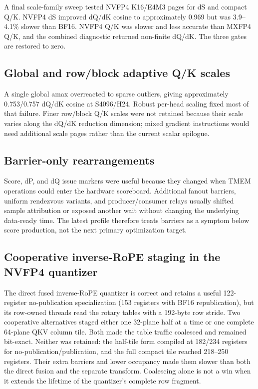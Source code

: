 A final scale-family sweep tested NVFP4 K16/E4M3 pages for dS and compact Q/K.
NVFP4 dS improved dQ/dK cosine to approximately 0.969 but was 3.9--4.1\%
slower than BF16.  NVFP4 Q/K was slower and less accurate than MXFP4 Q/K, and
the combined diagnostic returned non-finite dQ/dK.  The three gates are
restored to zero.

\subsection{Global and row/block adaptive Q/K scales}

A single global amax overreacted to sparse outliers, giving approximately
0.753/0.757 dQ/dK cosine at S4096/H24.  Robust per-head scaling fixed most of
that failure.  Finer row/block Q/K scales were not retained because their
scale varies along the dQ/dK reduction dimension; mixed gradient instructions
would need additional scale pages rather than the current scalar epilogue.

\subsection{Barrier-only rearrangements}

Score, dP, and dQ issue markers were useful because they changed when TMEM
operations could enter the hardware scoreboard.  Additional fanout barriers,
uniform rendezvous variants, and producer/consumer relays usually shifted
sample attribution or exposed another wait without changing the underlying
data-ready time.  The latest profile therefore treats barriers as a symptom
below score production, not the next primary optimization target.

\subsection{Cooperative inverse-RoPE staging in the NVFP4 quantizer}

The direct fused inverse-RoPE quantizer is correct and retains a useful
122-register no-publication specialization (153 registers with BF16
republication), but its row-owned threads read
the rotary tables with a 192-byte row stride.  Two cooperative alternatives
staged either one 32-plane half at a time or one complete 64-plane QKV column
tile.  Both made the table traffic coalesced and remained bit-exact.  Neither
was retained: the half-tile form compiled at 182/234 registers for
no-publication/publication, and the full compact tile reached 218--250
registers.  Their extra barriers and lower occupancy made them slower than
both the direct fusion and the separate transform.  Coalescing alone is not a
win when it extends the lifetime of the quantizer's complete row fragment.
